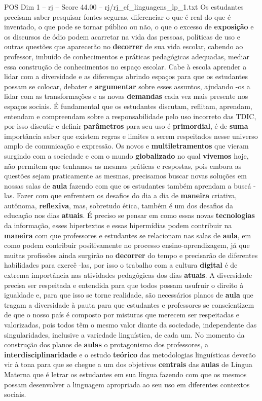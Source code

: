 \begin{textsample}{POS Dim 1 – rj – Score 44.00 – rj/rj\_ef\_linguagens\_lp\_1.txt}
Os estudantes precisam saber pesquisar fontes seguras, diferenciar o que é real do que é inventado, o que pode se tornar público ou não, o que o excesso de \textbf{exposição} e os discursos de ódio podem acarretar na vida das pessoas, políticas de uso e outras questões que aparecerão no \textbf{decorrer} de sua vida escolar, cabendo ao professor, imbuído de conhecimentos e práticas pedagógicas adequadas, mediar essa construção de conhecimentos no espaço escolar.
Cabe à escola aprender a lidar com a diversidade e as diferenças abrindo espaços para que os estudantes possam se colocar, debater e \textbf{argumentar} sobre esses assuntos, ajudando -os a lidar com as transformações e as novas \textbf{demandas} cada vez mais presente nos espaços sociais.
É fundamental que os estudantes discutam, reflitam, aprendam, entendam e compreendam sobre a responsabilidade pelo uso incorreto das TDIC, por isso discutir e definir \textbf{parâmetros} para seu uso é \textbf{primordial}, é de \textbf{suma} importância saber que existem regras e limites a serem respeitados nesse universo amplo de comunicação e expressão.
Os novos e \textbf{multiletramentos} que vieram surgindo com a sociedade e com o mundo \textbf{globalizado} no qual \textbf{vivemos} hoje, não permitem que tenhamos as mesmas práticas e respostas, pois embora as questões sejam praticamente as mesmas, precisamos buscar novas soluções em nossas salas de \textbf{aula} fazendo com que os estudantes também aprendam a buscá -las.
Fazer com que enfrentem os desafios do dia a dia de \textbf{maneira} criativa, autônoma, \textbf{reflexiva}, mas, sobretudo ética, também é um dos desafios da educação nos dias \textbf{atuais}.
É preciso se pensar em como essas novas \textbf{tecnologias} da informação, esses hipertextos e essas hipermídias podem contribuir na \textbf{maneira} com que professores e estudantes se relacionam nas salas de \textbf{aula}, em como podem contribuir positivamente no processo ensino-aprendizagem, já que muitas profissões ainda surgirão no \textbf{decorrer} do tempo e precisarão de diferentes habilidades para exercê -las, por isso o trabalho com a cultura \textbf{digital} é de extrema importância nas atividades pedagógicas dos dias \textbf{atuais}.
A diversidade precisa ser respeitada e entendida para que todos possam usufruir o direito à igualdade e, para que isso se torne realidade, são necessários planos de \textbf{aula} que tragam a diversidade à pauta para que estudantes e professores se conscientizem de que o nosso país é composto por misturas que merecem ser respeitadas e valorizadas, pois todos têm o mesmo valor diante da sociedade, independente das singularidades, inclusive a variedade linguística, de cada um.
No momento da construção dos planos de \textbf{aulas} o protagonismo dos professores, a \textbf{interdisciplinaridade} e o estudo \textbf{teórico} das metodologias linguísticas deverão vir à tona para que se chegue a um dos objetivos \textbf{centrais} das \textbf{aulas} de Língua Materna que é letrar os estudantes em sua língua fazendo com que os mesmos possam desenvolver a linguagem apropriada ao seu uso em diferentes contextos sociais.


\end{textsample}

